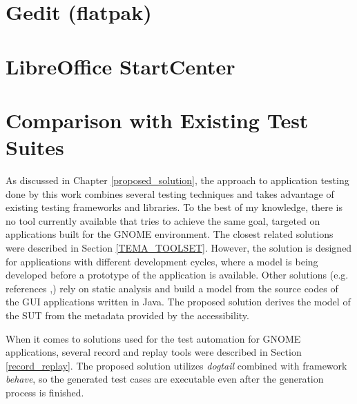 \section{Gedit (flatpak)}
\section{LibreOffice StartCenter}
\section{Comparison with Existing Test Suites}
As discussed in Chapter \ref{proposed_solution}, the approach to application testing done by this work combines several testing techniques and takes advantage of existing testing frameworks and libraries. To the best of my knowledge, there is no tool currently available that tries to achieve the same goal, targeted on applications built for the GNOME environment. The closest related solutions were described in Section \ref{TEMA_TOOLSET}. However, the solution is designed for applications with different development cycles, where a model is being developed before a prototype of the application is available. Other solutions (e.g. references \cite{ReisJacinto2018Aetw},\cite{ArltS2012LSAf}) rely on static analysis and build a model from the source codes of the GUI applications written in Java. The proposed solution derives the model of the SUT from the metadata provided by the accessibility.

When it comes to solutions used for the test automation for GNOME applications, several record and replay tools were described in Section \ref{record_replay}. The proposed solution utilizes \textit{dogtail} combined with framework \textit{behave}, so the generated test cases are executable even after the generation process is finished.


